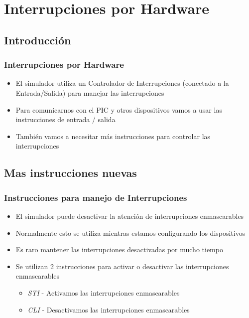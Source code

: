 \documentclass{beamer}
\begin{document}
\section{Interrupciones por Hardware}
\subsection{Introducción}
\begin{frame}
\frametitle{Interrupciones por Hardware}
\begin{itemize}
 \item El simulador utiliza un Controlador de Interrupciones (conectado a la Entrada/Salida) para manejar las interrupciones
 \item Para comunicarnos con el PIC y otros dispositivos vamos a usar las instrucciones de entrada / salida
 \item También vamos a necesitar más instrucciones para controlar las interrupciones
\end{itemize}
\end{frame}

\subsection{Mas instrucciones nuevas}
\begin{frame}
\frametitle{Instrucciones para  manejo de Interrupciones}

\begin{itemize}

 \item El simulador puede desactivar la atención de interrupciones enmascarables
 \item Normalmente esto se utiliza mientras estamos configurando los dispositivos
 \item Es raro mantener las interrupciones desactivadas por mucho tiempo
 \item Se utilizan 2 instrucciones para activar o desactivar las interrupciones enmascarables 
\begin{itemize}
\item \emph{STI} - Activamos las interrupciones enmascarables
 \item \emph{CLI} - Desactivamos las interrupciones enmascarables
\end{itemize}
\end{itemize}

\end{frame}
\end{document}
